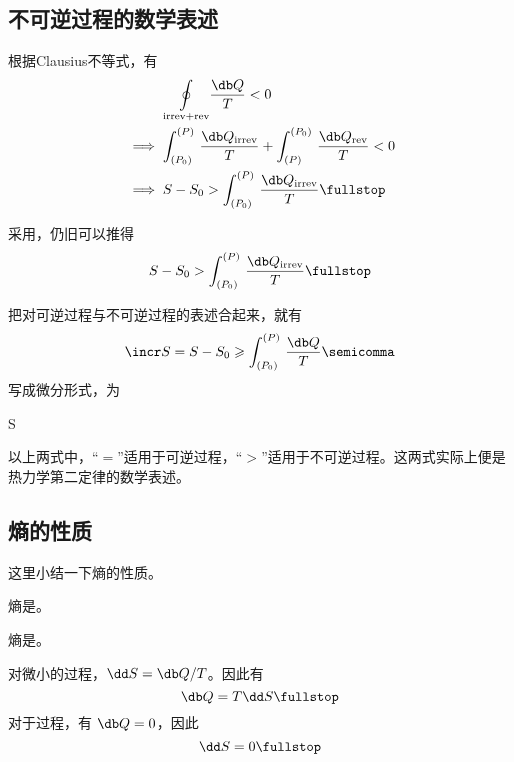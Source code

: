   \subsection{不可逆过程的数学表述}
    \begin{myEnum1}
        根据Clausius不等式，有
        \begin{align}
          &\mathrel{\phantom{\implies}} \underset{\text{irrev} + \text{rev}}{\oint} \frac{\db Q}{T} < 0 \notag \\
          &\implies \int_{(P_0)}^{(P)} \, \frac{\db Q_\text{irrev}}{T} + \int_{(P)}^{(P_0)} \, \frac{\db Q_\text{rev}}{T} < 0 \notag \\
          &\implies S - S_0 > \int_{(P_0)}^{(P)} \, \frac{\db Q_\text{irrev}}{T} \fullstop
        \end{align}
        
        采用，仍旧可以推得
        \begin{equation}
          S - S_0 > \int_{(P_0)}^{(P)} \, \frac{\db Q_\text{irrev}}{T} \fullstop
        \end{equation} %
    \end{myEnum1}
    
    \blankline
    
    把对可逆过程与不可逆过程的表述合起来，就有
    \begin{equation} \label{EQ_2ND_LAW_IN_INTEGRAL_FORM}
      \incr S = S - S_0 \geqslant \int_{(P_0)}^{(P)} \, \frac{\db Q}{T} \semicomma
    \end{equation}
    写成微分形式，为
    \begin{boxedEq} \label{EQ_2ND_LAW_IN_DIFFERENTIAL_FORM}
      \dd S \geqslant {}
    \end{boxedEq}
    以上两式中，“$=$”适用于可逆过程，“$>$”适用于不可逆过程。这两式实际上便是热力学第二定律的数学表述。
    
  \subsection{熵的性质}
    这里小结一下熵的性质。
    
    \begin{myEnum2}
      \item 熵是。
      \item 熵是。
      \item 对微小的过程，$\dd S = \db Q / T$。因此有
      \begin{equation} \label{EQ_dQ=TdS}
        \db Q = T \dd S \fullstop
      \end{equation}
      对于过程，有 $\db Q = 0$，因此
      \begin{equation} \label{EQ_dS=0_FOR_ADIABATIC_REVERSIBLE_PROCESS}
        \dd S = 0 \fullstop
      \end{equation}
    \end{myEnum2}%
    
